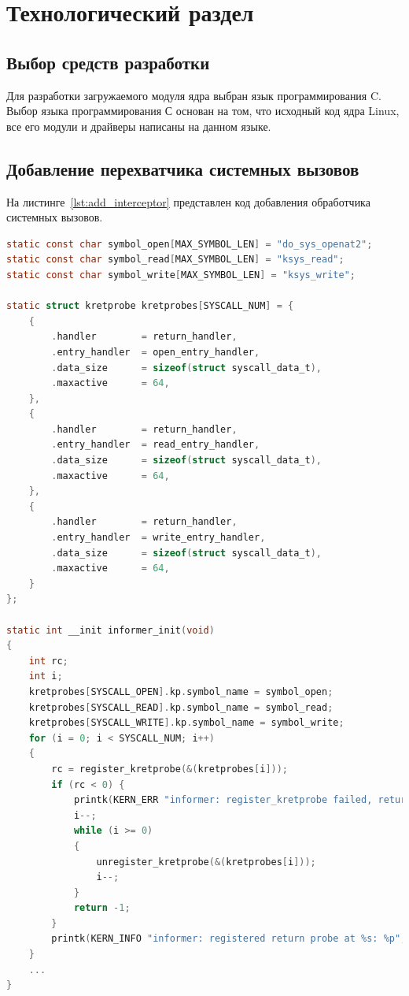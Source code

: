 \chapter{Технологический раздел}

\section{Выбор средств разработки}

Для разработки загружаемого модуля ядра выбран язык программирования C. Выбор языка программирования С основан на том, что исходный код ядра Linux, все его модули и драйверы написаны на данном языке.

\section{Добавление перехватчика системных вызовов}

На листинге~\ref{lst:add_interceptor} представлен код добавления обработчика системных вызовов.

\begin{lstlisting}[language=C, label=lst:add_interceptor, caption={Добавление обработчиков системных вызовов}]
static const char symbol_open[MAX_SYMBOL_LEN] = "do_sys_openat2";
static const char symbol_read[MAX_SYMBOL_LEN] = "ksys_read";
static const char symbol_write[MAX_SYMBOL_LEN] = "ksys_write";

static struct kretprobe kretprobes[SYSCALL_NUM] = {
    {
        .handler		= return_handler,
        .entry_handler	= open_entry_handler,
        .data_size		= sizeof(struct syscall_data_t),
        .maxactive		= 64,
    },
    {
        .handler		= return_handler,
        .entry_handler	= read_entry_handler,
        .data_size		= sizeof(struct syscall_data_t),
        .maxactive		= 64,
    },
    {
        .handler		= return_handler,
        .entry_handler	= write_entry_handler,
        .data_size		= sizeof(struct syscall_data_t),
        .maxactive		= 64,
    }
};

static int __init informer_init(void)
{
    int rc;
    int i;
    kretprobes[SYSCALL_OPEN].kp.symbol_name = symbol_open;
    kretprobes[SYSCALL_READ].kp.symbol_name = symbol_read;
    kretprobes[SYSCALL_WRITE].kp.symbol_name = symbol_write;
    for (i = 0; i < SYSCALL_NUM; i++)
    {
        rc = register_kretprobe(&(kretprobes[i]));
        if (rc < 0) {
            printk(KERN_ERR "informer: register_kretprobe failed, returned %d", rc);
            i--;
            while (i >= 0)
            {
                unregister_kretprobe(&(kretprobes[i]));
                i--;
            }
            return -1;
        }
        printk(KERN_INFO "informer: registered return probe at %s: %p", kretprobes[i].kp.symbol_name, kretprobes[i].kp.addr);
    }
    ...
}
\end{lstlisting}

